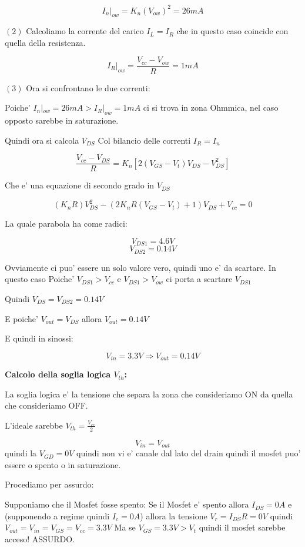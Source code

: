 \documentclass[\main/main.tex]{subfiles}
\begin{document}
\[I_n|_{ow} = K_n \left(V_{ow}\right)^2 = 26mA\]

$(2)$ Calcoliamo la corrente del carico $I_{L} = I_{R}$ che in questo caso coincide con quella della resistenza.

\[I_R|_{ow} = \frac{V_{cc} - V_{ow}}{R} = 1mA\]

$(3)$ Ora si confrontano le due correnti:

Poiche' $I_n|_{ow} = 26mA > I_R|_{ow} = 1mA$ ci si trova in zona Ohmmica, nel caso opposto sarebbe in saturazione.

Quindi ora si calcola $V_{DS}$ Col bilancio delle correnti $I_R = I_n$

\[\frac{V_{cc} - V_{DS}}{R} = K_n \left[ 2 \left(V_{GS} - V_t \right)V_{DS} - V_{DS}^2 \right]\]

Che e' una equazione di secondo grado in $V_{DS}$ 

\[\left(K_n R \right) V_{DS}^2 - \left(2K_nR\left(V_{GS}-V_t\right)+1\right)V_{DS}+V_{cc} = 0\]

La quale parabola ha come radici:

\[V_{DS1} = 4.6V \]
\[V_{DS2} = 0.14V \]

Ovviamente ci puo' essere un solo valore vero, quindi uno e' da scartare.
In questo caso Poiche' $V_{DS1} > V_{cc}$ e $V_{DS1} > V_{ow}$ ci porta a scartare $V_{DS1}$

Quindi $V_{DS} = V_{DS2} = 0.14V$

E poiche' $V_{out} = V_{DS}$ allora $V_{out} = 0.14V$

E quindi in sinossi:

\[V_{in} = 3.3V \Rightarrow V_{out} = 0.14V\]

\textbf{Calcolo della soglia logica $V_{th}$:}

La soglia logica e' la tensione che separa la zona che consideriamo ON da quella che consideriamo OFF.

L'ideale sarebbe $V_{th} = \frac{V_{cc}}{2}$

\[V_{in} = V_{out}\]
quindi la $V_{GD} = 0V$ quindi non vi e' canale dal lato del drain quindi il mosfet puo' essere o spento o in saturazione.

Procediamo per assurdo:

Supponiamo che il Mosfet fosse spento:
Se il Mosfet e' spento allora $I_{DS} = 0A$ e (supponendo a regime quindi $I_c = 0A$) allora la tensione $V_r = I_{DS} R = 0V$ quindi $V_{out} = V_{in} = V_{GS} = V_{cc} = 3.3V$
Ma se $V_{GS} = 3.3V > V_t$ quindi il mosfet sarebbe acceso!
ASSURDO.
\end{document}
